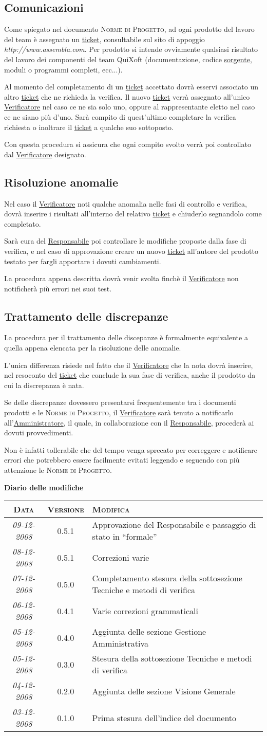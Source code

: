 \documentclass[11pt,a4paper]{article}
\newcommand{\modifiche} 
{
\newpage
\begin{center}
\textbf{Diario delle modifiche} \\
\bigskip
\begin{tabular}{|c|c|p{0.51\textwidth}|}
\hline
\textsc{Data} & \textsc{Versione} & \textsc{Modifica} \\
\hline
\hline
\textit{09-12-2008} & 0.5.1 & Approvazione del Responsabile e passaggio di stato in ``formale''  \\
\hline
\textit{08-12-2008} & 0.5.1 & Correzioni varie  \\
\hline
\textit{07-12-2008} & 0.5.0 & Completamento stesura della sottosezione Tecniche e metodi di verifica  \\
\hline
\textit{06-12-2008} & 0.4.1 & Varie correzioni grammaticali  \\
\hline
\textit{05-12-2008} & 0.4.0 & Aggiunta delle sezione Gestione Amministrativa  \\
\hline
\textit{05-12-2008} & 0.3.0 & Stesura della sottosezione Tecniche e metodi di verifica  \\
\hline
\textit{04-12-2008} & 0.2.0 & Aggiunta delle sezione Visione Generale  \\
\hline
\textit{03-12-2008} & 0.1.0 & Prima stesura dell'indice del documento \\
\hline
\end{tabular}
\end{center}
}
\begin{document}
\subsection{Comunicazioni}
Come spiegato nel documento \textsc{Norme di Progetto}, ad ogni prodotto del lavoro del team è assegnato un \underline{ticket}, consultabile sul sito di appoggio \textit{http://www.assembla.com}. Per prodotto si intende ovviamente qualsiasi risultato del lavoro dei componenti del team QuiXoft (documentazione, codice \underline{sorgente}, moduli o programmi completi, ecc...).

Al momento del completamento di un \underline{ticket} accettato dovrà esservi associato un altro \underline{ticket} che ne richieda la verifica. Il nuovo \underline{ticket} verrà assegnato all'unico \underline{Verificatore} nel caso ce ne sia solo uno, oppure al rappresentante eletto nel caso ce ne siano più d'uno. Sarà compito di quest'ultimo completare la verifica richiesta o inoltrare il \underline{ticket} a qualche suo sottoposto.

Con questa procedura si assicura che ogni compito svolto verrà poi controllato dal \underline{Verificatore} designato.
\subsection{Risoluzione anomalie}
Nel caso il \underline{Verificatore} noti qualche anomalia nelle fasi di controllo e verifica, dovrà inserire i risultati all'interno del relativo \underline{ticket} e chiuderlo segnandolo come completato.

Sarà cura del \underline{Responsabile} poi controllare le modifiche proposte dalla fase di verifica, e nel caso di approvazione creare un nuovo \underline{ticket} all'autore del prodotto testato per fargli apportare i dovuti cambiamenti.

La procedura appena descritta dovrà venir svolta finchè il \underline{Verificatore} non notificherà più errori nei suoi test.
\subsection{Trattamento delle discrepanze}
La procedura per il trattamento delle discepanze è formalmente equivalente a quella appena elencata per la risoluzione delle anomalie.

L'unica differenza risiede nel fatto che il \underline{Verificatore} che la nota dovrà inserire, nel resoconto del \underline{ticket} che conclude la sua fase di verifica, anche il prodotto da cui la discrepanza è nata.

Se delle discrepanze dovessero presentarsi frequentemente tra i documenti prodotti e le \textsc{Norme di Progetto}, il \underline{Verificatore} sarà tenuto a notificarlo all'\underline{Amministratore}, il quale, in collaborazione con il \underline{Responsabile}, procederà ai dovuti provvedimenti.

Non è infatti tollerabile che del tempo venga sprecato per correggere e notificare errori che potrebbero essere facilmente evitati leggendo e seguendo con più attenzione le \textsc{Norme di Progetto}.
\modifiche
\end{document}
